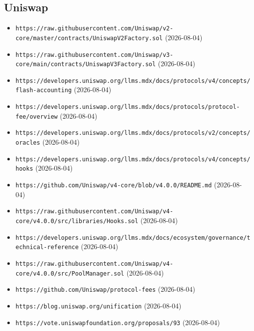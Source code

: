 \subsection*{Uniswap}
\begin{itemize}\setlength{\itemsep}{0pt}\small
\item \texttt{https://raw.githubusercontent.com/Uniswap/v2-core/master/contracts/UniswapV2Factory.sol} (2026-08-04)
\item \texttt{https://raw.githubusercontent.com/Uniswap/v3-core/main/contracts/UniswapV3Factory.sol} (2026-08-04)
\item \texttt{https://developers.uniswap.org/llms.mdx/docs/protocols/v4/concepts/flash-accounting} (2026-08-04)
\item \texttt{https://developers.uniswap.org/llms.mdx/docs/protocols/protocol-fee/overview} (2026-08-04)
\item \texttt{https://developers.uniswap.org/llms.mdx/docs/protocols/v2/concepts/oracles} (2026-08-04)
\item \texttt{https://developers.uniswap.org/llms.mdx/docs/protocols/v4/concepts/hooks} (2026-08-04)
\item \texttt{https://github.com/Uniswap/v4-core/blob/v4.0.0/README.md} (2026-08-04)
\item \texttt{https://raw.githubusercontent.com/Uniswap/v4-core/v4.0.0/src/libraries/Hooks.sol} (2026-08-04)
\item \texttt{https://developers.uniswap.org/llms.mdx/docs/ecosystem/governance/technical-reference} (2026-08-04)
\item \texttt{https://raw.githubusercontent.com/Uniswap/v4-core/v4.0.0/src/PoolManager.sol} (2026-08-04)
\item \texttt{https://github.com/Uniswap/protocol-fees} (2026-08-04)
\item \texttt{https://blog.uniswap.org/unification} (2026-08-04)
\item \texttt{https://vote.uniswapfoundation.org/proposals/93} (2026-08-04)
\end{itemize}

